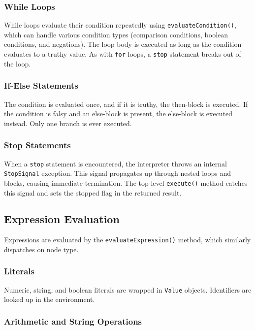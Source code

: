 \subsubsection{While Loops}

While loops evaluate their condition repeatedly using \texttt{evaluateCondition()}, which can handle various condition types (comparison conditions, boolean conditions, and negations).
The loop body is executed as long as the condition evaluates to a truthy value. As with \texttt{for} loops, a \texttt{stop} statement breaks out of the loop.

\subsubsection{If-Else Statements}

The condition is evaluated once, and if it is truthy, the then-block is executed.
If the condition is falsy and an else-block is present, the else-block is executed instead.
Only one branch is ever executed.

\subsubsection{Stop Statements}

When a \texttt{stop} statement is encountered, the interpreter throws an internal \texttt{StopSignal} exception.
This signal propagates up through nested loops and blocks, causing immediate termination.
The top-level \texttt{execute()} method catches this signal and sets the stopped flag in the returned result.

\subsection{Expression Evaluation}

Expressions are evaluated by the \texttt{evaluateExpression()} method, which similarly dispatches on node type.

\subsubsection{Literals}

Numeric, string, and boolean literals are wrapped in \texttt{Value} objects. Identifiers are looked up in the environment.

\subsubsection{Arithmetic and String Operations}


